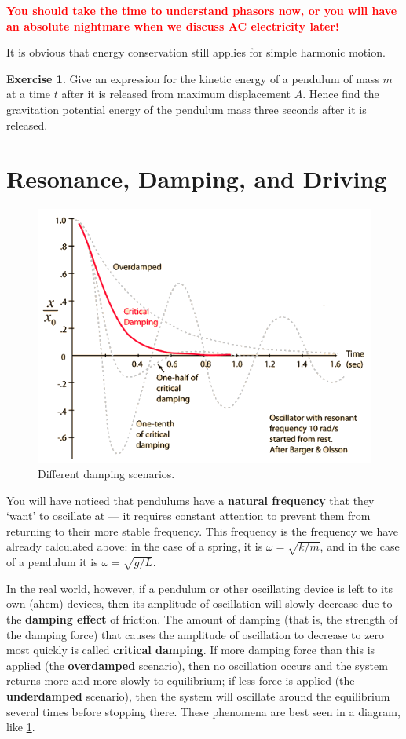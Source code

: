 \documentclass[a4paper]{amsbook}
\theoremstyle{definition}
\newtheorem{exercise}{Exercise}
\numberwithin{exercise}{chapter}
\numberwithin{exercise}{chapter}
\begin{document}
\textbf{\textcolor{red}{You should take the time to understand phasors now, or you will have an absolute nightmare when we discuss AC electricity later!}}

It is obvious that energy conservation still applies for simple harmonic motion.
\begin{exercise}
  Give an expression for the kinetic energy of a pendulum of mass $ m $ at a time $ t $ after it is released from maximum displacement $ A $.
  Hence find the gravitation potential energy of the pendulum mass three seconds after it is released.
\end{exercise}

\section{Resonance, Damping, and Driving}
\begin{figure}
  \centering
  \includegraphics[width=\textwidth]{damping}
  \caption{Different damping scenarios.\label{fig:damping}}
\end{figure}
You will have noticed that pendulums have a \textbf{natural frequency} that they `want' to oscillate at --- it requires
constant attention to prevent them from returning to their more stable frequency. This frequency is the frequency we have
already calculated above: in the case of a spring, it is $ \omega = \sqrt{k/m} $, and in the case of a pendulum it is $ \omega = \sqrt{g/L} $.

In the real world, however, if a pendulum or other oscillating device is left to its own (ahem) devices, then its amplitude of oscillation
will slowly decrease due to the \textbf{damping effect} of friction. The amount of damping (that is, the strength of the damping force) that
causes the amplitude of oscillation to decrease to zero most quickly is called \textbf{critical damping}. If more damping force than this is
applied (the \textbf{overdamped} scenario), then no oscillation occurs and the system returns more and more slowly to equilibrium; if less
force is applied (the \textbf{underdamped} scenario), then the system will oscillate around the equilibrium several times before stopping there.
These phenomena are best seen in a diagram, like \cref{fig:damping}.
\end{document}
